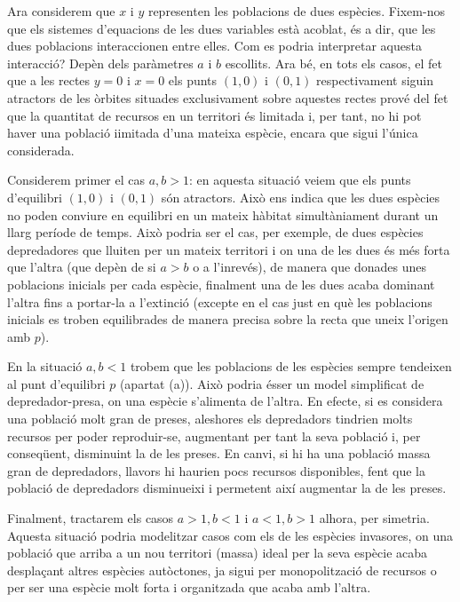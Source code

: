 \documentclass{article}
\begin{document}
Ara considerem que $x$ i $y$ representen les poblacions de dues espècies. Fixem-nos que els sistemes d'equacions de les dues variables està acoblat, és a dir, que les dues poblacions interaccionen entre elles. Com es podria interpretar aquesta interacció? Depèn dels paràmetres $a$ i $b$ escollits. Ara bé, en tots els casos, el fet que a les rectes $y=0$ i $x=0$ els punts $(1,0)$ i $(0,1)$ respectivament siguin atractors de les òrbites situades exclusivament sobre aquestes rectes prové del fet que la quantitat de recursos en un territori és limitada i, per tant, no hi pot haver una població i\lgem imitada d'una mateixa espècie, encara que sigui l'única considerada.
\par
Considerem primer el cas $a, b>1$: en aquesta situació veiem que els punts d'equilibri $(1,0)$ i $(0,1)$ són atractors. Això ens indica que les dues espècies no poden conviure en equilibri en un mateix hàbitat simultàniament durant un llarg període de temps. Això podria ser el cas, per exemple, de dues espècies depredadores que lluiten per un mateix territori i on una de les dues és més forta que l'altra (que depèn de si $a>b$ o a l'inrevés), de manera que donades unes poblacions inicials per cada espècie, finalment una de les dues acaba dominant l'altra fins a portar-la a l'extinció (excepte en el cas just en què les poblacions inicials es troben equilibrades de manera precisa sobre la recta que uneix l'origen amb $p$). 
\par 
En la situació $a,b<1$ trobem que les poblacions de les espècies sempre tendeixen al punt d'equilibri $p$ (apartat (a)). Això podria ésser un model simplificat de depredador-presa, on una espècie s'alimenta de l'altra. En efecte, si es considera una població molt gran de preses, aleshores els depredadors tindrien molts recursos per poder reproduir-se, augmentant per tant la seva població i, per conseqüent, disminuint la de les preses. En canvi, si hi ha una població massa gran de depredadors, llavors hi haurien pocs recursos disponibles, fent que la població de depredadors disminueixi i permetent així augmentar la de les preses. 
\par 
Finalment, tractarem els casos $a>1, b<1$ i $a<1, b>1$ alhora, per simetria. Aquesta situació podria modelitzar casos com els de les espècies invasores, on una població que arriba a un nou territori (massa) ideal per la seva espècie acaba desplaçant altres espècies autòctones, ja sigui per monopolització de recursos o per ser una espècie molt forta i organitzada que acaba amb l'altra. 
\end{document}
